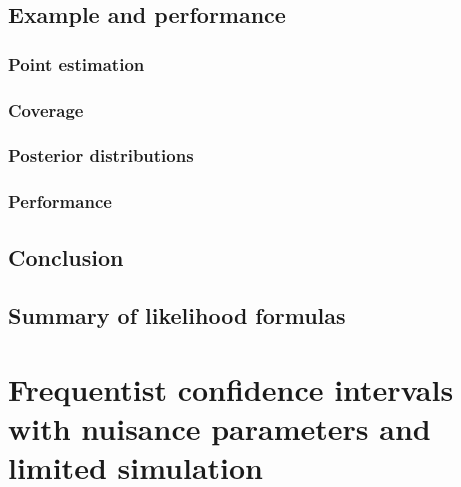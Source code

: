\subsection{Example and performance\label{sec:example}}
\begingroup
\graphicspath{{results/mcllh_paper/}}

\endgroup

\subsubsection{Point estimation\label{sec:pointestimation}}
\begingroup
\graphicspath{{results/mcllh_paper/}}

\endgroup

\subsubsection{Coverage\label{sec:coverage}}
\begingroup
\graphicspath{{results/mcllh_paper/}}

\endgroup

\subsubsection{Posterior distributions\label{sec:posterior}}
\begingroup
\graphicspath{{results/mcllh_paper/}}

\endgroup

\subsubsection{Performance\label{sec:performance}}
\begingroup
\graphicspath{{results/mcllh_paper/}}

\endgroup

\subsection{Conclusion\label{sec:llhconclusion}}
\begingroup
\graphicspath{{results/mcllh_paper/}}

\endgroup

\subsection{Summary of likelihood formulas\label{sec:llhtable}}
\begingroup
\graphicspath{{results/mcllh_paper/}}

\endgroup
\FloatBarrier
\section{Frequentist confidence intervals with nuisance parameters and limited simulation}\label{sec:low_stats_confidence_intervals}

